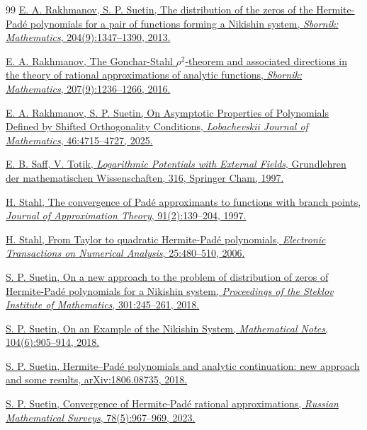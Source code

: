 \documentclass[11pt, a4paper, twoside]{article}
\theoremstyle{plain}
\theoremstyle{definition}
\begin{document}
\begin{thebibliography}{99}
 \href{https://www.mathnet.ru/eng/msb8168}{E. A. Rakhmanov, S. P. Suetin, The distribution of the zeros of the Hermite-Padé polynomials for a pair of functions forming a Nikishin system, \textit{Sbornik: Mathematics}, 204(9):1347--1390, 2013.}

 \href{https://www.mathnet.ru/eng/msb8448}{E. A. Rakhmanov, The Gonchar-Stahl $\rho^2$-theorem and associated directions in the theory of rational approximations of analytic functions, \textit{Sbornik: Mathematics}, 207(9):1236--1266, 2016.}

 \href{https://doi.org/10.1134/S199508022561094X}{E. A. Rakhmanov, S. P. Suetin, On Asymptotic Properties of Polynomials Defined by Shifted Orthogonality Conditions, \textit{Lobachevskii Journal of Mathematics}, 46:4715--4727, 2025.}

 \href{https://doi.org/10.1007/978-3-031-65133-5}{E. B. Saff, V. Totik, \textit{Logarithmic Potentials with External Fields}, Grun\-dlehren der mathematischen Wissenschaften, 316, Springer Cham, 1997.}

 \href{https://doi.org/10.1006/jath.1997.3141}{H. Stahl, The convergence of Padé approximants to functions with branch points, \textit{Journal of Approximation Theory}, 91(2):139--204, 1997.}

 \href{https://emis.dsd.sztaki.hu/journals/ETNA/vol.25.2006/pp480-510.dir/pp480-510.pdf}{H. Stahl, From Taylor to quadratic Hermite-Padé polynomials, \textit{Electronic Transactions on Numerical Analysis}, 25:480--510, 2006.}

 \href{https://www.mathnet.ru/eng/tm3908}{S. P. Suetin, On a new approach to the problem of distribution of zeros of Hermite-Padé polynomials for a Nikishin system, \textit{Proceedings of the Steklov Institute of Mathematics}, 301:245--261, 2018.}

 \href{https://www.mathnet.ru/eng/mzm12181}{S. P. Suetin, On an Example of the Nikishin System, \textit{Mathematical Notes}, 104(6):905--914, 2018.}

 \href{https://arxiv.org/abs/1806.08735}{S. P. Suetin, Hermite--Padé polynomials and analytic continuation: new approach and some results, arXiv:1806.08735, 2018.}

 \href{https://www.mathnet.ru/eng/umn10144}{S. P. Suetin, Convergence of Hermite-Padé rational approximations, \textit{Russian Mathematical Surveys}, 78(5):967--969, 2023.}


\end{thebibliography}
\end{document}
